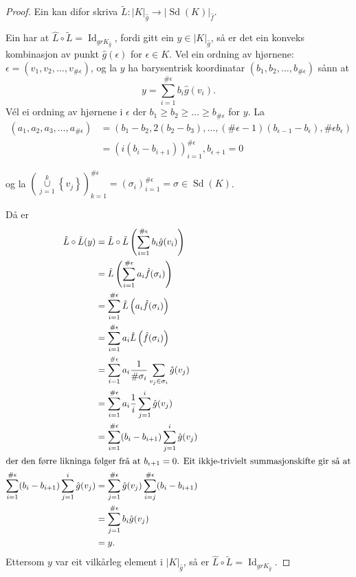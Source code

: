 \documentclass[a4paper, 12pt, norsk]{article}
\theoremstyle{plain}
\theoremstyle{definition}
\newcommand{\union}{ \mathop{\cup}\limits }
\newcommand{\gr}[1]{ \lvert #1 \rvert } %
\newcommand{\set}[1]{ \left\{ #1 \right\} } %
\newcommand{\tuple}[1]{ \left( #1 \right) } %
\DeclareMathOperator{\Sd}{Sd} %
\DeclareMathOperator{\Id}{Id} %
\begin{document}
\begin{proof}
	Ein kan difor skriva \( \tilde{L}: \gr{K}_{\hat{g}} \to \gr{\Sd(K)}_{\hat{f}} \).

	Ein har at \( \hat{L}\circ\tilde{L} = \Id_{gr{K}_{\hat{g}}} \), fordi gitt ein \( y \in \gr{K}_{\hat{g}} \), så er det ein konveks kombinasjon av punkt \( \hat{g}(\epsilon) \) for \( \epsilon \in K \). Vel ein ordning av hjørnene: \( \epsilon = (v_1, v_2, \dots, v_{\#\epsilon}) \), og la \( y \) ha barysentrisk koordinatar \( (b_1, b_2, \dots, b_{\#\epsilon}) \) sånn at
	\[
		y = \sum_{i = 1}^{\#\epsilon} b_i \hat{g}(v_i).
	\]
	Vél ei ordning av hjørnene i \( \epsilon \) der \( b_1 \geq b_2 \geq \dots \geq b_{\#\epsilon} \) for \( y \). La 
	\begin{align*}
		(a_1, a_2, a_3, \dots, a_{\#\epsilon}) &= \left( b_1-b_2, 2(b_2-b_3), \dots, (\#\epsilon-1)(b_{\epsilon-1}-b_{\epsilon}), \#\epsilon b_{\epsilon} \right) \\
		&= \left( i (b_i-b_{i+1}) \right)_{i=1}^{\#\epsilon}, b_{\epsilon+1} = 0
	\end{align*}
		
	og la \( \left(\union_{j = 1}^{k} \set{v_j} \right)_{k=1}^{\#\epsilon} = (\sigma_i)_{i=1}^{\#\epsilon}=\sigma \in \Sd(K) \).

	Då er
	\begin{align*} %
		\hat{L}\circ\tilde{L}(y) &= \hat{L}\circ\tilde{L}\tuple{\sum_{i=1}^{\#\epsilon} b_i \hat{g}(v_i)} \\
		&= \hat{L}\left( \sum_{i=1}^{\#\epsilon} a_i \hat{f}(\sigma_i) \right) \\
		&= \sum_{i=1}^{\#\epsilon} \hat{L} \left( a_i \hat{f}(\sigma_i) \right) \\
		&= \sum_{i=1}^{\#\epsilon} a_i \hat{L} \left( \hat{f}(\sigma_i) \right) \\
		&= \sum_{i=1}^{\#\epsilon} a_i \frac{1}{\#\sigma_i} \sum_{v_j \in \sigma_i} \hat{g}(v_j) \\
		&= \sum_{i=1}^{\#\epsilon} a_i \frac{1}{i} \sum_{j = 1}^{i} \hat{g}(v_j) \\
		&= \sum_{i=1}^{\#\epsilon} (b_{i}-b_{i+1}) \sum_{j = 1}^{i} \hat{g}(v_j) \\
		\intertext{der den førre likninga følger frå at \( b_{\epsilon+1} = 0 \). Eit ikkje-trivielt summasjonskifte gir så at}
		\sum_{i=1}^{\#\epsilon} (b_{i}-b_{i+1}) \sum_{j = 1}^{i} \hat{g}(v_j) &= \sum_{j=1}^{\#\epsilon} \hat{g}(v_j) \sum_{i = j}^{\#\epsilon} (b_{i}-b_{i+1}) \\
		&= \sum_{j=1}^{\#\epsilon} b_i \hat{g}(v_j) \\
		&= y.
	\end{align*}
	Ettersom \( y \) var eit vilkårleg element i \( \gr{K}_{\hat{g}} \), så er \( \hat{L}\circ\tilde{L} = \Id_{gr{K}_{\hat{g}}} \).


\end{proof}
\end{document}
